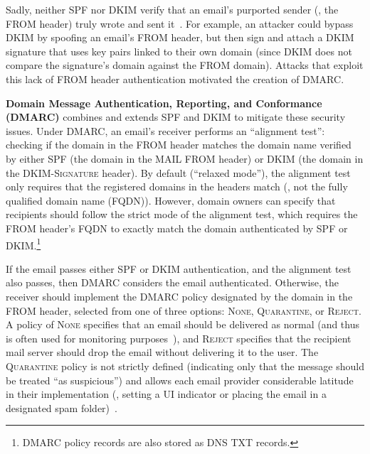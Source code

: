 Sadly, neither SPF nor DKIM verify that an email's purported sender (\ie, the \textsc{FROM} header) truly wrote and sent it~\cite{chen2020composition}.
For example, an attacker could bypass DKIM by spoofing an email's \textsc{FROM} header, but then sign and attach a DKIM signature that uses key pairs linked to their own domain (since DKIM does not compare the signature's domain against the \textsc{FROM} domain).
Attacks that exploit
this lack of \textsc{FROM} header authentication motivated the creation of DMARC.

\medskip
\noindent\textbf{Domain Message Authentication, Reporting, and
Conformance (DMARC)} combines and extends SPF and DKIM to mitigate these security issues.
Under DMARC, an email's receiver performs an ``alignment test'': checking if the
domain in the \textsc{FROM} header matches the domain name verified by
either SPF (the domain in the \textsc{MAIL FROM} header) or DKIM (the
domain in the \textsc{DKIM-Signature} header).
By default (``relaxed mode''), the alignment test only requires that the registered domains in the headers match (\ie, not the fully qualified domain name (FQDN)). However, domain owners can specify that recipients should follow the strict mode of the alignment test, which requires the \textsc{FROM} header's FQDN to exactly match the domain authenticated by SPF or DKIM.\footnote{%
DMARC policy records are also stored as DNS TXT records.} 

If the email passes either SPF or DKIM authentication, and the alignment test also passes, then DMARC considers the email authenticated.
Otherwise, the receiver should implement the DMARC policy designated by the domain in the \textsc{FROM} header, selected from one of three options: \textsc{None},
\textsc{Quarantine}, or \textsc{Reject}.  A policy of \textsc{None}
specifies that an email should be delivered as normal (and thus is often used for monitoring purposes~\cite{DMARCMonitoring1,DMARCMonitoring2}), and \textsc{Reject}
specifies that the recipient mail server should drop the email without
delivering it to the user.  The \textsc{Quarantine} policy is not strictly
defined (indicating only that the message should be treated ``as
suspicious'') and allows each email provider considerable latitude in
their implementation (\eg, setting a UI indicator or placing the email
in a designated spam folder)~\cite{rfc7489}.


